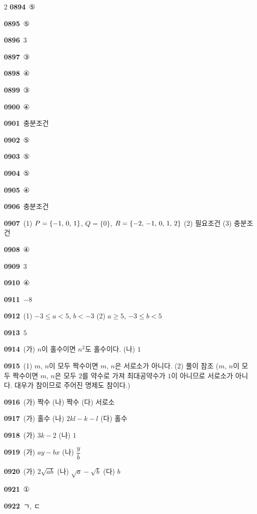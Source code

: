 \documentclass[10pt,a4paper]{article}
\begin{document}
\begin{multicols}{2}
\noindent\textbf{0894}\ ⑤\par
\noindent\textbf{0895}\ ⑤\par
\noindent\textbf{0896}\ $3$\par
\noindent\textbf{0897}\ ③\par
\noindent\textbf{0898}\ ④\par
\noindent\textbf{0899}\ ③\par
\noindent\textbf{0900}\ ④\par
\noindent\textbf{0901}\ 충분조건\par
\noindent\textbf{0902}\ ⑤\par
\noindent\textbf{0903}\ ⑤\par
\noindent\textbf{0904}\ ⑤\par
\noindent\textbf{0905}\ ④\par
\noindent\textbf{0906}\ 충분조건\par
\noindent\textbf{0907}\ (1) $P=\{-1,\mkern3mu 0,\mkern3mu 1\}$, $Q=\{0\}$, $R=\{-2,\mkern3mu -1,\mkern3mu 0,\mkern3mu 1,\mkern3mu 2\}$ (2) 필요조건 (3) 충분조건\par
\noindent\textbf{0908}\ ④\par
\noindent\textbf{0909}\ $3$\par
\noindent\textbf{0910}\ ④\par
\noindent\textbf{0911}\ $-8$\par
\noindent\textbf{0912}\ (1) $-3\le a<5$, $b<-3$ (2) $a\ge 5$, $-3\le b<5$\par
\noindent\textbf{0913}\ $5$\par
\noindent\textbf{0914}\ (가) $n$이 홀수이면 $n^2$도 홀수이다. (나) $1$\par
\noindent\textbf{0915}\ (1) $m$, $n$이 모두 짝수이면 $m$, $n$은 서로소가 아니다. (2) 풀이 참조 ($m$, $n$이 모두 짝수이면 $m$, $n$은 모두 $2$를 약수로 가져 최대공약수가 $1$이 아니므로 서로소가 아니다. 대우가 참이므로 주어진 명제도 참이다.)\par
\noindent\textbf{0916}\ (가) 짝수 (나) 짝수 (다) 서로소\par
\noindent\textbf{0917}\ (가) 홀수 (나) $2kl-k-l$ (다) 홀수\par
\noindent\textbf{0918}\ (가) $3k-2$ (나) $1$\par
\noindent\textbf{0919}\ (가) $ay-bx$ (나) $\dfrac{y}{b}$\par
\noindent\textbf{0920}\ (가) $2\sqrt{ab}$ (나) $\sqrt{a}-\sqrt{b}$ (다) $b$\par
\noindent\textbf{0921}\ ①\par
\noindent\textbf{0922}\ ㄱ, ㄷ\par

\end{multicols}
\end{document}
